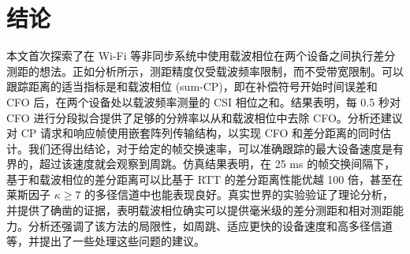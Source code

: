 \documentclass[journal]{IEEEtran}
\begin{document}
\section{结论}
本文首次探索了在 Wi-Fi 等非同步系统中使用载波相位在两个设备之间执行差分测距的想法。正如分析所示，测距精度仅受载波频率限制，而不受带宽限制。可以跟踪距离的适当指标是和载波相位 (sum-CP)，即在补偿符号开始时间误差和 CFO 后，在两个设备处以载波频率测量的 CSI 相位之和。结果表明，每 0.5 秒对 CFO 进行分段拟合提供了足够的分辨率以从和载波相位中去除 CFO。分析还建议对 CP 请求和响应帧使用嵌套阵列传输结构，以实现 CFO 和差分距离的同时估计。我们还得出结论，对于给定的帧交换速率，可以准确跟踪的最大设备速度是有界的，超过该速度就会观察到周跳。仿真结果表明，在 25 ms 的帧交换间隔下，基于和载波相位的差分距离可以比基于 RTT 的差分距离性能优越 100 倍，甚至在莱斯因子 $\kappa \ge 7$ 的多径信道中也能表现良好。真实世界的实验验证了理论分析，并提供了确凿的证据，表明载波相位确实可以提供毫米级的差分测距和相对测距能力。分析还强调了该方法的局限性，如周跳、适应更快的设备速度和高多径信道等，并提出了一些处理这些问题的建议。

\appendices
\end{document}
